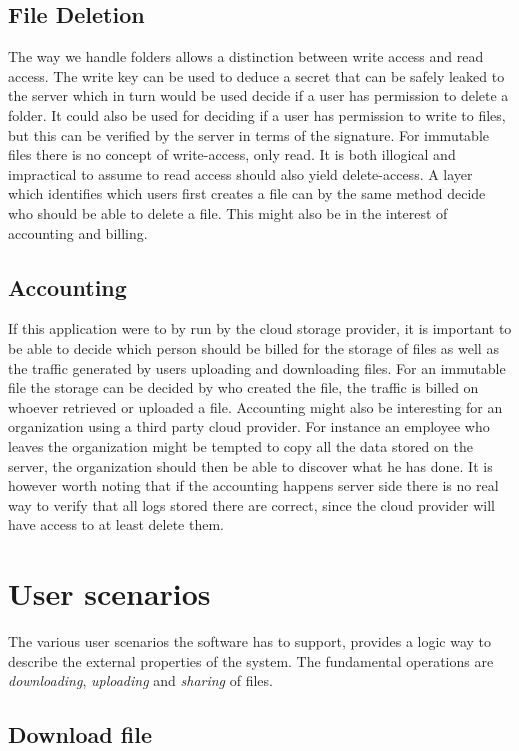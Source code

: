 \documentclass[pdftex,english,10pt,b5paper,twoside]{book}
\begin{document}
\subsection{File Deletion}
The way we handle folders allows a distinction between write access and read
access. The write key can be used to deduce a secret that can be safely leaked
to the server which in turn would be used decide if a user has permission to
delete a folder. It could also be used for deciding if a user has permission to
write to files, but this can be verified by the server in terms of the
signature.
For immutable files there is no concept of write-access, only read. It is
both illogical and impractical to assume to read access should also yield
delete-access. A layer which identifies which users first creates a file can
by the same method decide who should be able to delete a file. This might also
be in the interest of accounting and billing.

\subsection{Accounting}
If this application were to by run by the cloud storage provider, it is
important to be able to decide which person should be billed for the storage of
files as well as the traffic generated by users uploading and downloading
files. For an immutable file the storage can be decided by who created the
file, the traffic is billed on whoever retrieved or uploaded a file.
Accounting might also be interesting for an organization using a third party
cloud provider. For instance an employee who leaves the organization might be
tempted to copy all the data stored on the server, the organization should then
be able to discover what he has done. It is however worth noting that if the
accounting happens server side there is no real way to verify that all logs
stored there are correct, since the cloud provider will have access to at least
delete them.

\section{User scenarios}

The various user scenarios the software has to support, provides a logic way to
describe the external properties of the system. The fundamental operations are
\emph{downloading}, \emph{uploading} and \emph{sharing} of files.

\subsection{Download file}
\end{document}
